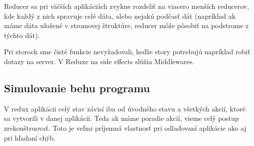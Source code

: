 Reducer sa pri väčších aplikáciách zvykne rozdeliť na viacero menších reducerov, kde každý z nich spravuje celé dáta, alebo nejakú podčasť dát (napríklad ak máme dáta uložené v stromovej štruktúre, reducer môže pôsobiť na podstrome z týchto dát).

Pri storoch sme čisté funkcie nevyžadovali, keďže story potrebujú napríklad robiť dotazy na server. V Reduxe na side effects slúžia Middlewares.

\subsection{Simulovanie behu programu}
V redux aplikácii celý stav závisí iba od úvodného stavu a všetkých akcií, ktoré sa vytvorili v danej aplikácii. Teda ak máme poradie akcií, vieme celý postup zrekonštruovať. Toto je veľmi príjemná vlastnosť pri odlaďovaní aplikácie ako aj pri hľadaní chýb.
